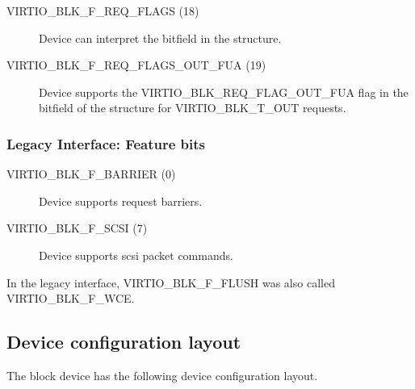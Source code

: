 \begin{description}
\item[VIRTIO_BLK_F_REQ_FLAGS (18)] Device can interpret the 
    bitfield in the  structure.

\item[VIRTIO_BLK_F_REQ_FLAGS_OUT_FUA (19)] Device supports the
    VIRTIO_BLK_REQ_FLAG_OUT_FUA flag in the  bitfield of the
     structure for VIRTIO_BLK_T_OUT requests.

\end{description}

\subsubsection{Legacy Interface: Feature bits}\label{sec:Device Types / Block Device / Feature bits / Legacy Interface: Feature bits}

\begin{description}
\item[VIRTIO_BLK_F_BARRIER (0)] Device supports request barriers.

\item[VIRTIO_BLK_F_SCSI (7)] Device supports scsi packet commands.
\end{description}

\begin{note}
  In the legacy interface, VIRTIO_BLK_F_FLUSH was also
  called VIRTIO_BLK_F_WCE.
\end{note}

\subsection{Device configuration layout}\label{sec:Device Types / Block Device / Device configuration layout}

The block device has the following device configuration layout.

